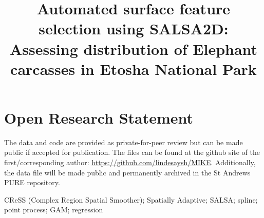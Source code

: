 \documentclass[letterpaper, 12pt]{interact}
\begin{document}
	\title{Automated surface feature selection using SALSA2D: Assessing 
		distribution of Elephant carcasses in Etosha National Park}
	
	\author{
	}
	
	
	
	\maketitle %
	
	\vspace{1cm}
	
	\section*{Open Research Statement}
	The data and code are provided as private-for-peer review but can be made public if accepted for publication.  The files can be found at the github site of the first/corresponding author: \url{https://github.com/lindesaysh/MIKE}. Additionally, the data file will be made public and permanently archived in the St Andrews PURE repository.
	
	\begin{keywords}
		CReSS (Complex Region Spatial Smoother); Spatially Adaptive; SALSA; spline; point process; GAM; regression
	\end{keywords}
	
\end{document}

